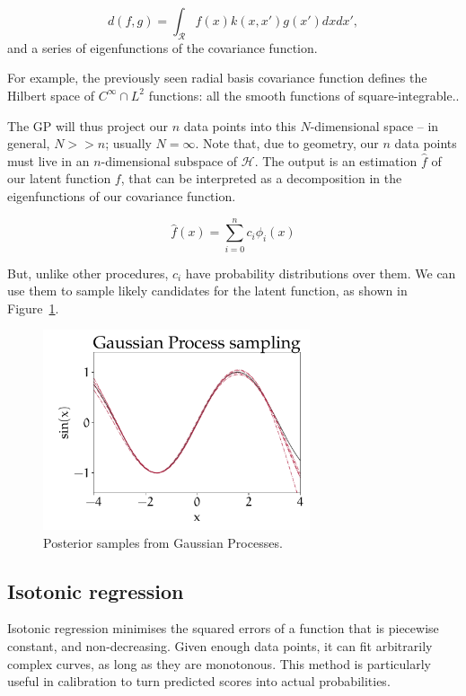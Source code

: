	\[	d(f, g) =\int_{\mathcal{R}}  f(x) k(x, x') g(x') dx dx', \]
and a series of eigenfunctions of the covariance function.
	
For example, the previously seen radial basis covariance function defines the Hilbert space of $C^\infty \cap L^2$ functions: all the smooth functions of square-integrable..
	
The GP will thus project our $n$ data points into this $N$-dimensional space -- in general, $N >> n$; usually $N = \infty$. Note that, due to geometry, our $n$ data points must live in an $n$-dimensional subspace of $\mathscr{H}$.
The output is an estimation $\hat f$ of our latent function $f$, that can be interpreted as a decomposition in the eigenfunctions of our covariance function.
	
	\[\hat f(x) = \sum_{i=0}^{n} c_i \phi_i(x)\]
	
But, unlike other procedures, $c_i$ have probability distributions over them.
We can use them to sample likely candidates for the latent function, as shown in Figure~\ref{fig:gp_sampling}.
	
\begin{figure}[hbt]
\centering
	\includegraphics[width=0.7\textwidth]{machine_learning/figures/sin_samples}
	\caption{Posterior samples from Gaussian Processes.}\label{fig:gp_sampling}
\end{figure}

\subsection{Isotonic regression}
Isotonic regression minimises the squared errors of a function that is piecewise constant, and non-decreasing.
Given enough data points, it can fit arbitrarily complex curves, as long as they are monotonous.
This method is particularly useful in calibration to turn predicted scores into actual probabilities.

